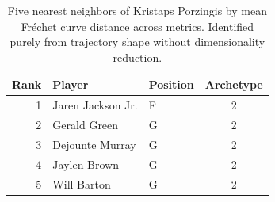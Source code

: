 \begin{table}[htbp]
  \centering\small
  \begin{tabular}{rllc}
    \toprule
    Rank & Player & Position & Archetype \\
    \midrule
    1 & Jaren Jackson Jr. & F & 2 \\
    2 & Gerald Green & G & 2 \\
    3 & Dejounte Murray & G & 2 \\
    4 & Jaylen Brown & G & 2 \\
    5 & Will Barton & G & 2 \\
    \bottomrule
  \end{tabular}
  \caption{Five nearest neighbors of Kristaps Porzingis by mean Fr\'{e}chet curve distance across metrics. Identified purely from trajectory shape without dimensionality reduction.}
  \label{tab:Kristaps_Porzingis_frechet_curve_neighbors}
\end{table}

